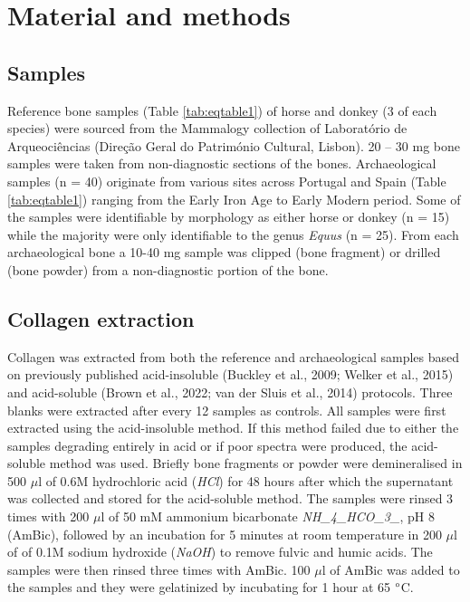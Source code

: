 \documentclass[preprint, 3p, authoryear]{elsarticle} %
\begin{document}
\hypertarget{material-and-methods}{%
\section{Material and methods}\label{material-and-methods}}

\hypertarget{samples}{%
\subsection{Samples}\label{samples}}

Reference bone samples (Table \ref{tab:eqtable1}) of horse and donkey (3 of each species) were sourced from the Mammalogy collection of Laboratório de Arqueociências (Direção Geral do Património Cultural, Lisbon). 20 -- 30 mg bone samples were taken from non-diagnostic sections of the bones. Archaeological samples (n = 40) originate from various sites across Portugal and Spain (Table \ref{tab:eqtable1}) ranging from the Early Iron Age to Early Modern period. Some of the samples were identifiable by morphology as either horse or donkey (n = 15) while the majority were only identifiable to the genus \emph{Equus} (n = 25). From each archaeological bone a 10-40 mg sample was clipped (bone fragment) or drilled (bone powder) from a non-diagnostic portion of the bone.

\hypertarget{collagen-extraction}{%
\subsection{Collagen extraction}\label{collagen-extraction}}

Collagen was extracted from both the reference and archaeological samples based on previously published acid-insoluble (Buckley et al., 2009; Welker et al., 2015) and acid-soluble (Brown et al., 2022; van der Sluis et al., 2014) protocols. Three blanks were extracted after every 12 samples as controls. All samples were first extracted using the acid-insoluble method. If this method failed due to either the samples degrading entirely in acid or if poor spectra were produced, the acid-soluble method was used. Briefly bone fragments or powder were demineralised in 500 \(\mu\)l of 0.6M hydrochloric acid (\emph{HCl}) for 48 hours after which the supernatant was collected and stored for the acid-soluble method. The samples were rinsed 3 times with 200 \(\mu\)l of 50 mM ammonium bicarbonate \emph{NH\_4\_HCO\_3\_}, pH 8 (AmBic), followed by an incubation for 5 minutes at room temperature in 200 \(\mu\)l of of 0.1M sodium hydroxide (\emph{NaOH}) to remove fulvic and humic acids. The samples were then rinsed three times with AmBic. 100 \(\mu\)l of AmBic was added to the samples and they were gelatinized by incubating for 1 hour at 65 \(\text{\textdegree}\)C.
\end{document}
